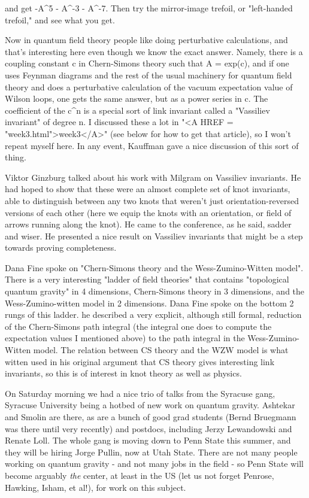 and get -A^5 - A^{-3} - A^{-7}.  Then try the mirror-image trefoil, or
"left-handed trefoil," and see what you get.

Now in quantum field theory people like doing perturbative calculations,
and that's interesting here even though we know the exact answer.
Namely, there is a coupling constant c in Chern-Simons theory such that
A = exp(c), and if one uses Feynman diagrams and the rest of the usual
machinery for quantum field theory and does a perturbative calculation
of the vacuum expectation value of Wilson loops, one gets the same
answer, but as a power series in c.  The coefficient of the c^n is a
special sort of link invariant called a "Vassiliev invariant" of degree
n.  I discussed these a lot in "<A HREF = "week3.html">week3</A>" (see below for how to get that
article), so I won't repeat myself here.  In any event, Kauffman gave a
nice discussion of this sort of thing.

Viktor Ginzburg talked about his work with Milgram on Vassiliev
invariants.  He had hoped to show that these were an almost complete set
of knot invariants, able to distinguish between any two knots that
weren't just orientation-reversed versions of each other (here we equip
the knots with an orientation, or field of arrows running along the
knot).  He came to the conference, as he said, sadder and wiser.  He
presented a nice result on Vassiliev invariants that might be a step
towards proving completeness.

Dana Fine spoke on "Chern-Simons theory and the Wess-Zumino-Witten
model".  There is a very interesting "ladder of field theories" that
contains "topological quantum gravity" in 4 dimensions, Chern-Simons
theory in 3 dimensions, and the Wess-Zumino-witten model in 2
dimensions.  Dana Fine spoke on the bottom 2 rungs of this ladder.
he described a very explicit, although still formal, reduction
of the Chern-Simons path integral (the integral one does to compute the
expectation values I mentioned above) to the path integral in the
Wess-Zumino-Witten model.  The relation between CS theory and the WZW
model is what witten used in his original argument that CS theory gives
interesting link invariants, so this is of interest in knot theory as
well as physics.  

On Saturday morning we had a nice trio of talks from the Syracuse gang,
Syracuse University being a hotbed of new work on quantum gravity.
Ashtekar and Smolin are there, as are a bunch of good grad students
(Bernd Bruegmann was there until very recently) and postdocs, including
Jerzy Lewandowski and Renate Loll.  The whole gang is moving down to
Penn State this summer, and they will be hiring Jorge Pullin, now at
Utah State.  There are not many people working on quantum gravity - and
not many jobs in the field - so Penn State will become arguably \emph{the}
center, at least in the US (let us not forget Penrose, Hawking, Isham,
et al!), for work on this subject.  

